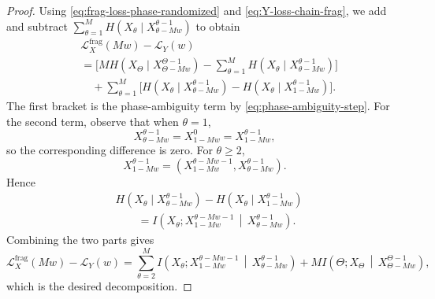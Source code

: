 \documentclass{article}
\theoremstyle{plain}
\theoremstyle{definition}
\theoremstyle{remark}
\begin{document}
\begin{proof}
    Using \eqref{eq:frag-loss-phase-randomized} and
    \eqref{eq:Y-loss-chain-frag}, we add and subtract
    \(\sum_{\theta=1}^{M}
    H(X_{\theta}\mid X_{\theta-Mw}^{\theta-1})\) to obtain
    \begin{align*}
    &\mathcal{L}_X^{\mathrm{frag}}(Mw) - \mathcal{L}_Y(w) \\
    &=
    \Bigg[
        M H\!\left(
            X_{\Theta}
            \mid
            X_{\Theta-Mw}^{\Theta-1}
        \right)
        -
        \sum_{\theta=1}^{M}
        H\!\left(
            X_{\theta}
            \mid
            X_{\theta-Mw}^{\theta-1}
        \right)
    \Bigg] \\
    &\quad+
    \sum_{\theta=1}^{M}
    \Bigg[
        H\!\left(
            X_{\theta}
            \mid
            X_{\theta-Mw}^{\theta-1}
        \right)
        -
        H\!\left(
            X_{\theta}
            \mid
            X_{1-Mw}^{\theta-1}
        \right)
    \Bigg].
    \end{align*}
    The first bracket is the phase-ambiguity term by
    \eqref{eq:phase-ambiguity-step}. For the second term, observe that when
    \(\theta=1\),
    \[
        X_{\theta-Mw}^{\theta-1}
        =
        X_{1-Mw}^{0}
        =
        X_{1-Mw}^{\theta-1},
    \]
    so the corresponding difference is zero. For \(\theta\ge 2\),
    \[
        X_{1-Mw}^{\theta-1}
        =
        \left(
            X_{1-Mw}^{\theta-Mw-1},
            X_{\theta-Mw}^{\theta-1}
        \right).
    \]
    Hence
    \begin{align*}
    & H\!\left(
            X_{\theta}
            \mid
            X_{\theta-Mw}^{\theta-1}
        \right)
        -
        H\!\left(
            X_{\theta}
            \mid
            X_{1-Mw}^{\theta-1}
        \right) \\
    &\qquad =
        I\!\left(
            X_{\theta};
            X_{1-Mw}^{\theta-Mw-1}
            \,\middle|\,
            X_{\theta-Mw}^{\theta-1}
        \right).
    \end{align*}
    Combining the two parts gives
    \[
    \mathcal{L}_X^{\mathrm{frag}}(Mw) - \mathcal{L}_Y(w)
    =
    \sum_{\theta = 2}^{M}
    I\!\left(
        X_{\theta};
        X_{1-Mw}^{\theta-Mw - 1}
        \,\middle|\,
        X_{\theta-Mw}^{\theta-1}
    \right)
    +
    M I\!\left(
        \Theta;
        X_{\Theta}
        \,\middle|\,
        X_{\Theta-Mw}^{\Theta-1}
    \right),
    \]
    which is the desired decomposition.
    

\end{proof}
\end{document}
